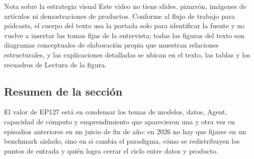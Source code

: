 \begin{knowledgebox}{Nota sobre la estrategia visual}
Este video no tiene slides, pizarrón, imágenes de artículos ni demostraciones de productos. Conforme al flujo de trabajo para pódcasts, el cuerpo del texto usa la portada solo para identificar la fuente y no vuelve a insertar las tomas fijas de la entrevista; todas las figuras del texto son diagramas conceptuales de elaboración propia que muestran relaciones estructurales, y las explicaciones detalladas se ubican en el texto, las tablas y los recuadros de Lectura de la figura.
\end{knowledgebox}

\subsection{Resumen de la sección}

El valor de EP127 está en condensar los temas de modelos, datos, Agent, capacidad de cómputo y emprendimiento que aparecieron una y otra vez en episodios anteriores en un juicio de fin de año: en 2026 no hay que fijarse en un benchmark aislado, sino en si cambia el paradigma, cómo se redistribuyen los puntos de entrada y quién logra cerrar el ciclo entre datos y producto.

